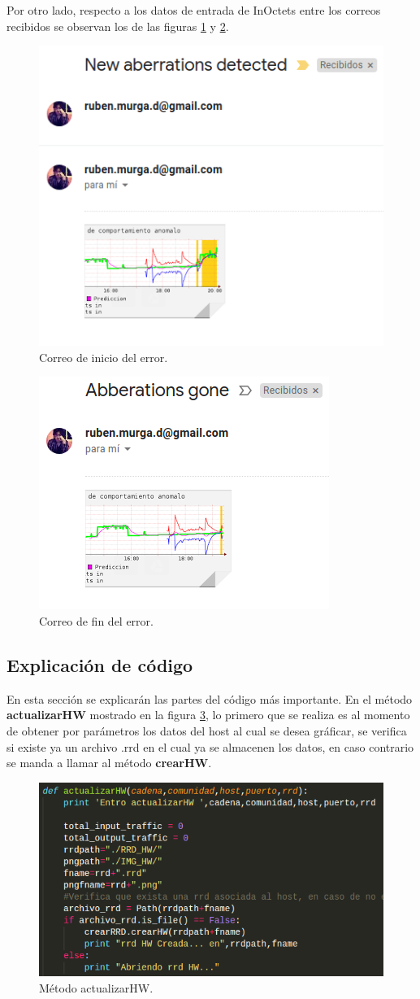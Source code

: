 \FloatBarrier
Por otro lado, respecto a los datos de entrada de InOctets entre los correos recibidos se observan los de las figuras \ref{image:inicio1} y \ref{image:fin1}.
\FloatBarrier
\begin{figure}[htbp!]
		\centering
			\includegraphics[width=.5 \textwidth]{images/inicio1}
		\caption{Correo de inicio del error.}
		\label{image:inicio1}
\end{figure}
\FloatBarrier
\FloatBarrier
\begin{figure}[htbp!]
		\centering
			\includegraphics[width=.45 \textwidth]{images/fin1}
		\caption{Correo de fin del error.}
		\label{image:fin1}
\end{figure}
\FloatBarrier

\subsection{Explicación de código}
En esta sección se explicarán las partes del código más importante. En el método \textbf{actualizarHW} mostrado en la figura \ref{image:codigo4}, lo primero que se realiza es al momento de obtener por parámetros los datos del host al cual se desea gráficar, se verifica si existe ya un archivo .rrd en el cual ya se almacenen los datos, en caso contrario se manda a llamar al método \textbf{crearHW}.
\FloatBarrier
\begin{figure}[htbp!]
		\centering
			\includegraphics[width=.7 \textwidth]{images/codigo4}
		\caption{Método actualizarHW.}
		\label{image:codigo4}
\end{figure}
\FloatBarrier


